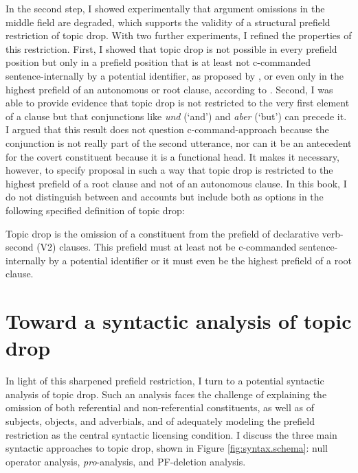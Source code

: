 In the second step, I showed experimentally that argument omissions in the middle field  are degraded, which supports the validity of a structural prefield restriction of topic drop.
With two further experiments, I refined the properties of this restriction.
First, I showed that topic drop is not possible in every prefield position but only in a prefield position that is at least not c-commanded  sentence-internally by a potential identifier, as proposed by \citet{rizzi1994}, or even only in the highest prefield of an autonomous or root clause, according to \citet{freywald2020}.
Second, I was able to provide evidence that topic drop is not restricted to the very first element of a clause but that conjunctions  like \textit{und} (`and') and \textit{aber} (`but') can precede it.
I argued that this result does not question  c-command-approach because  the conjunction is not really part of the second utterance, nor can it be an antecedent  for the covert constituent because it is a functional head.  
It makes it necessary, however, to specify  proposal in such a way that topic drop is restricted to the highest prefield of a root clause and not of an autonomous clause.
In this book, I do not distinguish between  and  accounts but include both as options in the following specified definition of topic drop:

\begin{theorem}\label{def:topic2}
Topic drop is the omission of a constituent from the prefield of declarative verb-second (V2) clauses.
This prefield must at least not be c-commanded  sentence-internally by a potential identifier or it must even be the highest prefield of a root clause.
\end{theorem}

\section{Toward a syntactic analysis of topic drop}\label{sec:syntax}
In light of this sharpened prefield restriction, I turn to a potential syntactic analysis of topic drop.
Such an analysis faces the challenge of explaining the omission of both referential and non-referential constituents, as well as of subjects, objects, and adverbials, and of adequately modeling the prefield restriction as the central syntactic licensing condition.
I discuss the three main syntactic approaches to topic drop, shown in Figure \ref{fig:syntax.schema}: null operator analysis,  \textit{pro}-analysis,  and PF-deletion analysis. 

